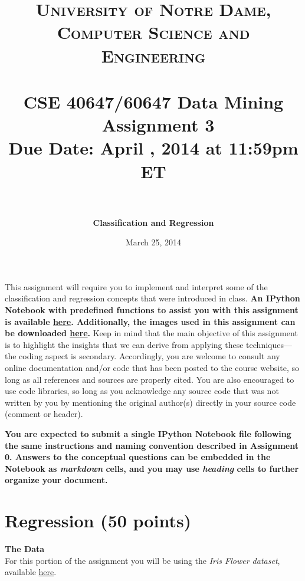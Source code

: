 \documentclass[paper=a4, fontsize=11pt]{scrartcl} %
\title{	
\normalfont \normalsize
\textsc{University of Notre Dame, Computer Science and Engineering} \\ [25pt] %
\horrule{0.5pt} \\[0.4cm] %
\huge CSE 40647/60647  Data Mining \textemdash~Assignment 3\\Due Date: April \nth{4}, 2014 at 11:59pm ET\\ %
\horrule{2pt} \\[0.5cm] %
}
\author{\textbf{Classification and Regression}} %
\date{\normalsize{March 25, 2014}} %
\numberwithin{equation}{section} %
\numberwithin{figure}{section} %
\numberwithin{table}{section} %
\begin{document}
\maketitle %


This assignment will require you to implement and interpret some of the classification and regression concepts that were introduced in class.  \textbf{An IPython Notebook with predefined functions to assist you with this assignment is available \href{https://github.com/cse40647/cse40647/blob/sp.14/assignment3/assignment3.ipynb}{here}. Additionally, the images used in this assignment can be downloaded  \href{https://github.com/cse40647/cse40647/blob/sp.14/assignment3/paintings.zip}{here}.} Keep in mind that the main objective of this assignment is to highlight the insights that we can derive from applying these techniques---the coding aspect is secondary. Accordingly, you are welcome to consult any online documentation and/or code that has been posted to the course website, so long as all references and sources are properly cited. You are also encouraged to use code libraries, so long as you acknowledge any source code that was not written by you by mentioning the original author(s) directly in your source code (comment or header).

\vspace{10pt}

\textbf{You are expected to submit a single IPython Notebook file following the same instructions and naming convention described in Assignment 0. Answers to the conceptual questions can be embedded in the Notebook as \textit{markdown} cells, and you may use \textit{heading} cells to further organize your document.}

\newpage

\section{Regression (50 points)}

\textbf{The Data}\\
For this portion of the assignment you will be using the \textit{Iris Flower dataset}, available \href{http://archive.ics.uci.edu/ml/machine-learning-databases/iris/iris.data}{here}.
\end{document}
